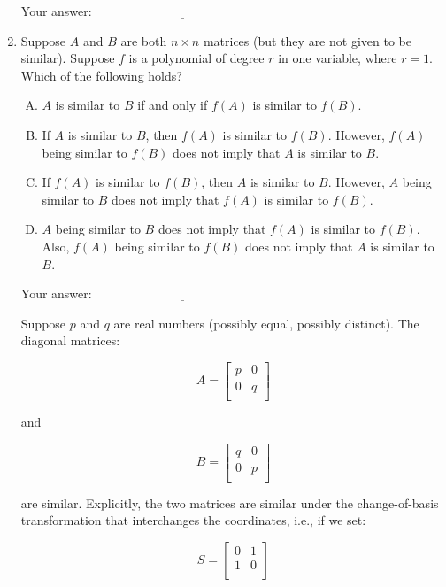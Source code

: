 \documentclass[10pt]{amsart}
\begin{document}
\begin{enumerate}
  \vspace{0.1in}
  Your answer: $\underline{\qquad\qquad\qquad\qquad\qquad\qquad\qquad}$
  \vspace{0.1in}

\item Suppose $A$ and $B$ are both $n \times n$ matrices (but they are
  not given to be similar). Suppose $f$ is a polynomial of degree $r$
  in one variable, where $r = 1$. Which of the following holds?

  \begin{enumerate}[(A)]
  \item $A$ is similar to $B$ if and only if $f(A)$ is similar to
    $f(B)$.
  \item If $A$ is similar to $B$, then $f(A)$ is similar to
    $f(B)$. However, $f(A)$ being similar to $f(B)$ does not
    imply that $A$ is similar to $B$.
  \item If $f(A)$ is similar to $f(B)$, then $A$ is similar to
    $B$. However, $A$ being similar to $B$ does not imply that $f(A)$
    is similar to $f(B)$.
  \item $A$ being similar to $B$ does not imply that $f(A)$ is
    similar to $f(B)$. Also, $f(A)$ being similar to $f(B)$
    does not imply that $A$ is similar to $B$.
  \end{enumerate}

  \vspace{0.1in}
  Your answer: $\underline{\qquad\qquad\qquad\qquad\qquad\qquad\qquad}$
  \vspace{0.6in}

Suppose $p$ and $q$ are real numbers (possibly equal, possibly distinct). The diagonal matrices:

$$A = \left[\begin{matrix} p & 0 \\ 0 & q \\\end{matrix}\right]$$

and

$$B = \left[\begin{matrix} q & 0 \\ 0 & p \\\end{matrix}\right]$$

are similar. Explicitly, the two matrices are similar under the
change-of-basis transformation that interchanges the coordinates,
i.e., if we set:

$$S = \left[\begin{matrix} 0 & 1 \\ 1 & 0 \\\end{matrix}\right]$$


\end{enumerate}
\end{document}
